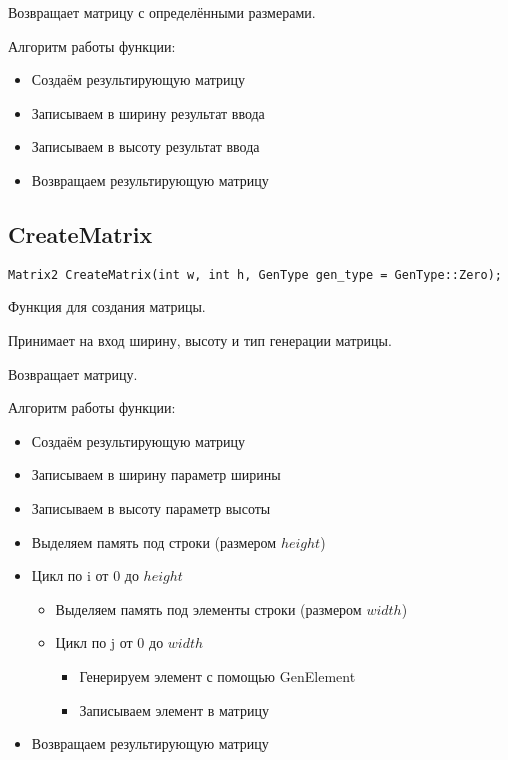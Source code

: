 Возвращает матрицу с определёнными размерами.

Алгоритм работы функции:

\begin{itemize}
	\item Создаём результирующую матрицу
	\item Записываем в ширину результат ввода
	\item Записываем в высоту результат ввода
	\item Возвращаем результирующую матрицу
\end{itemize}

\subsection*{CreateMatrix}

\begin{lstlisting}[label={lst:CreateMatrix}]
	Matrix2 CreateMatrix(int w, int h, GenType gen_type = GenType::Zero);
\end{lstlisting}

Функция для создания матрицы.

Принимает на вход ширину, высоту и тип генерации матрицы.

Возвращает матрицу.

Алгоритм работы функции:

\begin{itemize}
	\item Создаём результирующую матрицу
	\item Записываем в ширину параметр ширины
	\item Записываем в высоту параметр высоты
	\item Выделяем память под строки (размером $ height $)
	\item Цикл по i от 0 до $ height $
	\begin{itemize}
		\item Выделяем память под элементы строки (размером $ width $)
		\item Цикл по j от 0 до $ width $
		\begin{itemize}
			  \item Генерируем элемент с помощью GenElement
			  \item Записываем элемент в матрицу
		\end{itemize}
	\end{itemize}
	\item Возвращаем результирующую матрицу
\end{itemize}

